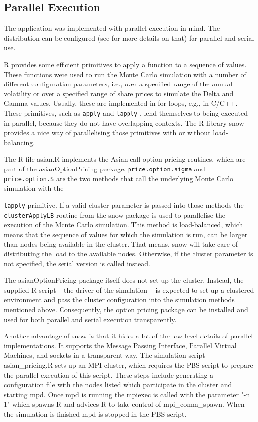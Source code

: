 \documentclass[12pt,a4paper]{article}
\def\rcode#1{
  \lstinline[basicstyle=\ttfamily,language=R]{#1} }
\begin{document}
\subsection{Parallel Execution}
\label{sec:parallel-execution}

The application was implemented with parallel execution in mind. The
distribution can be configured (see  for
more details on that) for parallel and serial use.

R provides some efficient primitives to apply a function to a sequence
of values. These functions were used to run the Monte Carlo simulation
with a number of different configuration parameters, i.e., over a
specified range of the annual volatility or over a specified range of
share prices to simulate the Delta and Gamma values.  Usually, these
are implemented in for-loops, e.g., in C/C++. These primitives, such
as \rcode{apply} and \rcode{lapply}, lend themselves to being executed
in parallel, because they do not have overlapping contexts. The R
library snow provides a nice way of parallelising those primitives
with or without load-balancing.

The R file asian.R implements the Asian call option pricing routines,
which are part of the asianOptionPricing
package. \rcode{price.option.sigma} and \rcode{price.option.S} are the
two methods that call the underlying Monte Carlo simulation with the
\rcode{lapply} primitive. If a valid cluster parameter is passed into
those methods the \rcode{clusterApplyLB} routine from the snow package
is used to parallelise the execution of the Monte Carlo
simulation. This method is load-balanced, which means that the
sequence of values for which the simulation is run, can be larger than
nodes being available in the cluster. That means, snow will take care
of distributing the load to the available nodes. Otherwise, if the
cluster parameter is not specified, the serial version is called
instead.

The asianOptionPricing package itself does not set up the
cluster. Instead, the supplied R script -- the driver of the
simulation -- is expected to set up a clustered environment and pass
the cluster configuration into the simulation methods mentioned
above. Consequently, the option pricing package can be installed and
used for both parallel and serial execution transparently.

Another advantage of snow is that it hides a lot of the low-level
details of parallel implementations. It supports the Message Passing
Interface, Parallel Virtual Machines, and sockets in a transparent
way. The simulation script asian\_pricing.R sets up an MPI cluster,
which requires the PBS script to prepare the parallel execution of
this script. These steps include generating a configuration file with
the nodes listed which participate in the cluster and starting
mpd. Once mpd is running the mpiexec is called with the parameter "-n
1" which spawns R and advices R to take control of
mpi\_comm\_spawn. When the simulation is finished mpd is stopped in the
PBS script.
\end{document}
